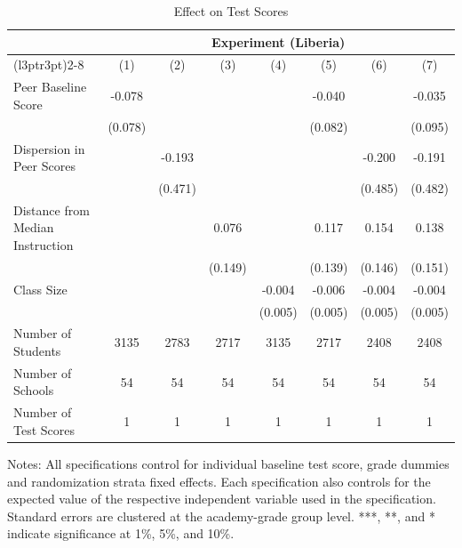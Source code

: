 \begin{table}[!h]
\centering\centering\centering
\caption{Effect on Test Scores}
\centering
\begin{threeparttable}
\fontsize{10}{12}\selectfont
\begin{tabular}[t]{lccccccc}
\toprule
\multicolumn{1}{c}{ } & \multicolumn{7}{c}{Experiment (Liberia)} \\
\cmidrule(l{3pt}r{3pt}){2-8}
  & (1) & (2) & (3) & (4) & (5) & (6) & (7)\\
\midrule
Peer Baseline Score & -0.078 &  &  &  & -0.040 &  & -0.035\\
 & (0.078) &  &  &  & (0.082) &  & (0.095)\\
Dispersion in Peer Scores &  & -0.193 &  &  &  & -0.200 & -0.191\\
 &  & (0.471) &  &  &  & (0.485) & (0.482)\\
Distance from Median Instruction &  &  & 0.076 &  & 0.117 & 0.154 & 0.138\\
 &  &  & (0.149) &  & (0.139) & (0.146) & (0.151)\\
Class Size &  &  &  & -0.004 & -0.006 & -0.004 & -0.004\\
 &  &  &  & (0.005) & (0.005) & (0.005) & (0.005)\\
\hline
\midrule
Number of Students & 3135 & 2783 & 2717 & 3135 & 2717 & 2408 & 2408\\
Number of Schools & 54 & 54 & 54 & 54 & 54 & 54 & 54\\
Number of Test Scores & 1 & 1 & 1 & 1 & 1 & 1 & 1\\
\bottomrule
\end{tabular}
\begin{tablenotes}[para]
\item Notes:
                      All specifications control for individual baseline test score,
                        grade dummies and randomization strata fixed effects. Each specification
                        also controls for the expected value of the respective independent variable
                         used in the specification. Standard errors are clustered at the academy-grade
                          group level. ***, **, and * indicate significance at 1\%, 5\%, and 10\%.
\end{tablenotes}
\end{threeparttable}
\end{table}
